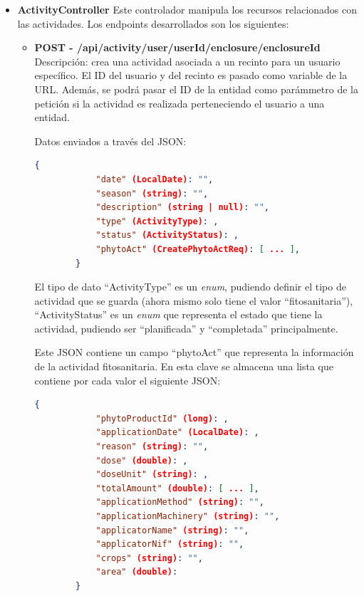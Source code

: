 \begin{itemize}
    \item \textbf{ActivityController}
    \newline
    Este controlador manipula los recursos relacionados con las actividades. Los endpoints desarrollados son los siguientes:

    \begin{itemize}
        \item \textbf{POST - /api/activity/user/{userId}/enclosure/{enclosureId}} \newline
        Descripción: crea una actividad asociada a un recinto para un usuario específico. El ID del usuario y del recinto es pasado como variable de la URL. Además, se podrá pasar el ID de la entidad como 
        parámmetro de la petición si la actividad es realizada perteneciendo el usuario a una entidad.
        
        Datos enviados a través del JSON:
        \begin{lstlisting}[language=json,caption={Creación de actividad realizada por usuario}]
        {
            "date" (LocalDate): "",
            "season" (string): "",
            "description" (string | null): "",
            "type" (ActivityType): ,
            "status" (ActivityStatus): ,
            "phytoAct" (CreatePhytoActReq): [ ... ],
        }
        \end{lstlisting}

        El tipo de dato ``ActivityType'' es un \textit{enum}, pudiendo definir el tipo de actividad que se guarda (ahora mismo solo tiene el valor ``fitosanitaria''), ``ActivityStatus'' es un \textit{enum} 
        que representa el estado que tiene la actividad, pudiendo ser ``planificada'' y ``completada'' principalmente.

        Este JSON contiene un campo ``phytoAct'' que representa la información de la actividad fitosanitaria. En esta clave se almacena una lista que contiene por cada valor el siguiente JSON:
        \begin{lstlisting}[language=json,caption={Creación de actividad realizada por usuario}]
        {
            "phytoProductId" (long): ,
            "applicationDate" (LocalDate): ,
            "reason" (string): "",
            "dose" (double): ,
            "doseUnit" (string): ,
            "totalAmount" (double): [ ... ],
            "applicationMethod" (string): "",
            "applicationMachinery" (string): "",
            "applicatorName" (string): "",
            "applicatorNif" (string): "",
            "crops" (string): "",
            "area" (double):  
        }
        \end{lstlisting}


\end{itemize}
\end{itemize}
